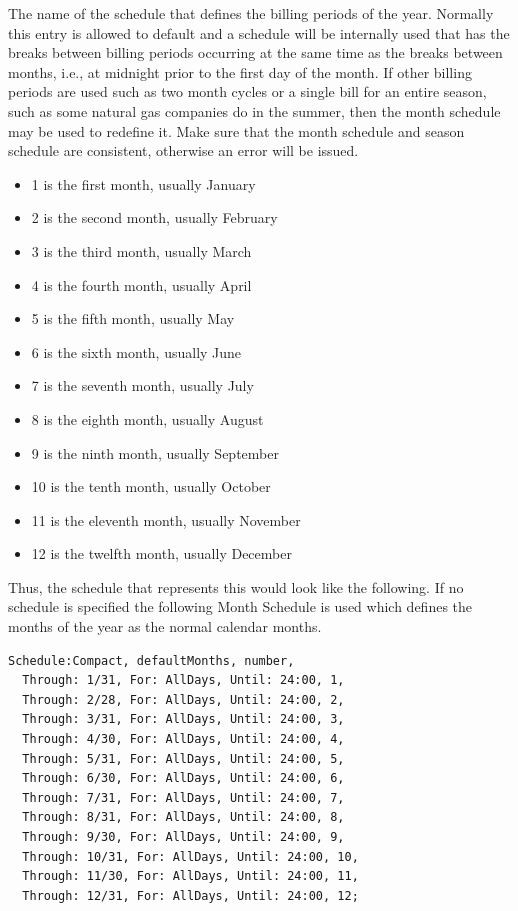 The name of the schedule that defines the billing periods of the year. Normally this entry is allowed to default and a schedule will be internally used that has the breaks between billing periods occurring at the same time as the breaks between months, i.e., at midnight prior to the first day of the month. If other billing periods are used such as two month cycles or a single bill for an entire season, such as some natural gas companies do in the summer, then the month schedule may be used to redefine it. Make sure that the month schedule and season schedule are consistent, otherwise an error will be issued.

\begin{itemize}
\item
  1 is the first month, usually January
\item
  2 is the second month, usually February
\item
  3 is the third month, usually March
\item
  4 is the fourth month, usually April
\item
  5 is the fifth month, usually May
\item
  6 is the sixth month, usually June
\item
  7 is the seventh month, usually July
\item
  8 is the eighth month, usually August
\item
  9 is the ninth month, usually September
\item
  10 is the tenth month, usually October
\item
  11 is the eleventh month, usually November
\item
  12 is the twelfth month, usually December
\end{itemize}

Thus, the schedule that represents this would look like the following. If no schedule is specified the following Month Schedule is used which defines the months of the year as the normal calendar months.

\begin{lstlisting}
Schedule:Compact, defaultMonths, number,
  Through: 1/31, For: AllDays, Until: 24:00, 1,
  Through: 2/28, For: AllDays, Until: 24:00, 2,
  Through: 3/31, For: AllDays, Until: 24:00, 3,
  Through: 4/30, For: AllDays, Until: 24:00, 4,
  Through: 5/31, For: AllDays, Until: 24:00, 5,
  Through: 6/30, For: AllDays, Until: 24:00, 6,
  Through: 7/31, For: AllDays, Until: 24:00, 7,
  Through: 8/31, For: AllDays, Until: 24:00, 8,
  Through: 9/30, For: AllDays, Until: 24:00, 9,
  Through: 10/31, For: AllDays, Until: 24:00, 10,
  Through: 11/30, For: AllDays, Until: 24:00, 11,
  Through: 12/31, For: AllDays, Until: 24:00, 12;
\end{lstlisting}

